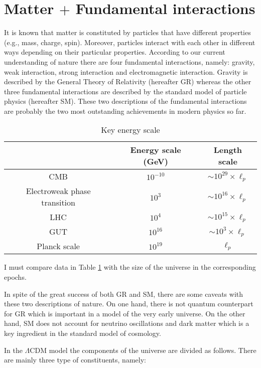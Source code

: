 \section{Matter $+$ Fundamental interactions}
\label{section:1.2}

It is known that matter is constituted by particles that have different properties (e.g., mass, charge, spin). Moreover, particles interact with each other in different ways depending on their particular properties. According to our current understanding of nature there are four fundamental interactions, namely: gravity, weak interaction, strong interaction and electromagnetic interaction. Gravity is described by the General Theory of Relativity (hereafter GR) whereas the other three fundamental interactions are described by the standard model of particle physics (hereafter SM). These two descriptions of the fundamental interactions are probably the two most outstanding achievements in modern physics so far. 

\begin{table}
\begin{tabular}{|c|c|c|}
\hline   & Energy scale (GeV) & Length scale \\ 
\hline  CMB &  $ 10^{-10} $ & $ \sim 10^{29} \times \ell_p $\\ 
\hline  Electroweak phase transition & $ 10^3 $ & $ \sim 10^{16} \times \ell_p $\\ 
\hline  LHC & $ 10^4 $ & $ \sim 10^{15} \times \ell_p $\\ 
\hline  GUT & $ 10^{16} $ & $ \sim 10^3 \times \ell_p $\\ 
\hline  Planck scale & $ 10^{19} $ & $ \ell_p $\\ 
\hline 
\end{tabular}
\caption{Key energy scale}
\label{table:1}
\end{table}

I must compare data in Table \ref{table:1} with the size of the universe in the corresponding epochs.


In spite of the great success of both GR and SM, there are some caveats with these two descriptions of nature. On one hand, there is not quantum counterpart for GR which is important in a model of the very early universe. On the other hand, SM does not account for neutrino oscillations and dark matter which is a key ingredient in the standard model of cosmology. 
  
In the $\Lambda$CDM model the components of the universe are divided as follows. There are mainly three type of constituents, namely: 

